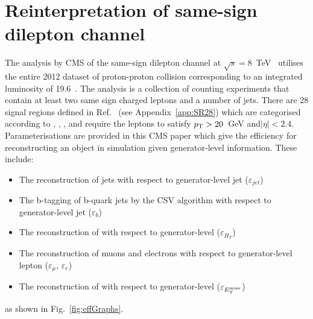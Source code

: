 \section{Reinterpretation of same-sign dilepton channel \label{sec:reinterp}}

The analysis by CMS of the same-sign dilepton channel at $\sqrt{s}=8$~TeV~\cite{Chatrchyan:2013fea} utilises the entire 2012 dataset of proton-proton collision corresponding to an integrated luminosity of 19.6~\fbinv. The analysis is a collection of counting experiments that contain at least two same sign charged leptons and a number of jets. There are 28 signal regions defined in Ref.~\cite{Chatrchyan:2013fea} (see Appendix~\ref{app:SR28}) which are categorised according to \njets, \nbtags, \HT, \MET and require the leptons to satisfy $p_{\mathrm{T}}>20$~GeV and$|\eta|<2.4$.
Parameterisations are provided in this CMS paper which give the efficiency for reconstructing an object in simulation given generator-level information. These include:
\begin{itemize}
\item The reconstruction of jets with respect to generator-level jet \pt ($\varepsilon_{jet}$)
\item The b-tagging of b-quark jets by the CSV algorithm with respect to generator-level jet \pt ($\varepsilon_{b}$)
\item The reconstruction of \HT with respect to generator-level \HT ($\varepsilon_{H_T}$)
\item The reconstruction of muons and electrons with respect to generator-level lepton \pt ($\varepsilon_{\mu}$, $\varepsilon_{e}$)
\item The reconstruction of \MET with respect to generator-level \MET ($\varepsilon_{E_{\mathrm{T}}^{\text{miss}}}$) 
\end{itemize}
as shown in Fig.~\ref{fig:effGraphs}.

